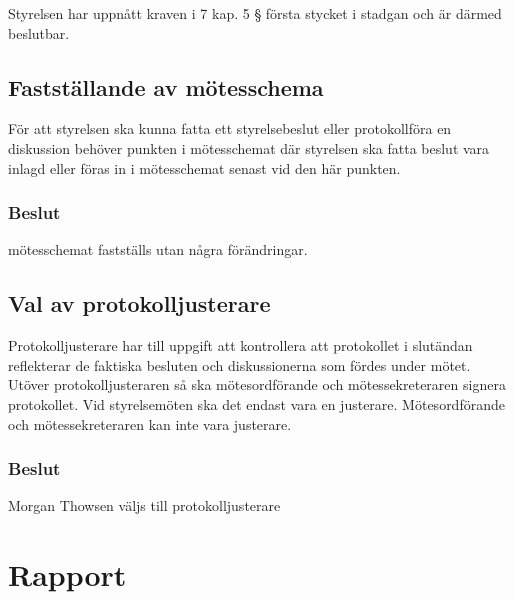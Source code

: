 \documentclass[protokoll]{dvd}
\begin{document}
\begin{attsatser}
    \item Styrelsen har uppnått kraven i 7 kap. 5 § första stycket i stadgan och är därmed beslutbar.
\end{attsatser}

\subsection{Fastställande av mötesschema}

För att styrelsen ska kunna fatta ett styrelsebeslut eller protokollföra en diskussion behöver punkten i mötesschemat där styrelsen ska fatta beslut vara inlagd eller föras in i mötesschemat senast vid den här punkten.

\subsubsection{Beslut}

\begin{attsatser}
    \item mötesschemat fastställs utan några förändringar.
\end{attsatser}

\subsection{Val av protokolljusterare}

Protokolljusterare har till uppgift att kontrollera att protokollet i slutändan reflekterar de faktiska besluten och diskussionerna som fördes under mötet.
Utöver protokolljusteraren så ska mötesordförande och mötessekreteraren signera protokollet.
Vid styrelsemöten ska det endast vara en justerare.
Mötesordförande och mötessekreteraren kan inte vara justerare.

\subsubsection{Beslut}
\begin{attsatser}
    \item Morgan Thowsen väljs till protokolljusterare
\end{attsatser}

\newpage

\section{Rapport}
\end{document}
